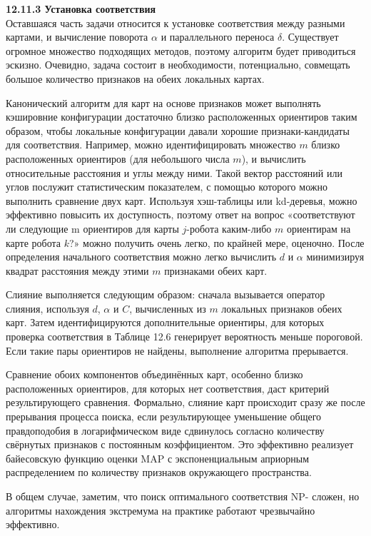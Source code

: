\documentclass[10pt,a4paper]{article}
\begin{document}
\textbf{12.11.3	Установка соответствия}\\

Оставшаяся часть задачи относится к установке соответствия между разными картами, и вычисление поворота $\alpha$ и параллельного переноса $\delta$. Существует огромное множество подходящих методов, поэтому алгоритм будет приводиться эскизно. Очевидно, задача состоит в необходимости, потенциально, совмещать большое количество признаков на обеих локальных картах.

Канонический алгоритм для карт на основе признаков может выполнять кэшировние конфигурации достаточно близко расположенных ориентиров таким образом, чтобы локальные конфигурации давали хорошие признаки-кандидаты для соответствия. Например, можно идентифицировать множество $m$ близко расположенных ориентиров (для небольшого числа $m$), и вычислить относительные расстояния и углы между ними. Такой вектор расстояний или углов послужит статистическим показателем, с помощью которого можно выполнить сравнение двух карт. Используя хэш-таблицы или kd-деревья, можно эффективно повысить их доступность, поэтому ответ на вопрос «соответствуют ли следующие m ориентиров для карты $j$-робота каким-либо $m$ ориентирам на карте робота $k$?» можно получить очень легко, по крайней мере, оценочно. После определения начального соответствия можно легко вычислить $d$ и $\alpha$ минимизируя квадрат расстояния между этими $m$ признаками обеих карт.

Слияние выполняется следующим образом: сначала вызывается оператор слияния, используя $d$, $\alpha$ и $C$, вычисленных из $m$ локальных признаков обеих карт. Затем идентифицируются дополнительные ориентиры, для которых проверка соответствия в Таблице 12.6 генерирует вероятность меньше пороговой. Если такие пары ориентиров не найдены, выполнение алгоритма прерывается.

Сравнение обоих компонентов объединённых карт, особенно близко расположенных ориентиров, для которых нет соответствия, даст критерий результирующего сравнения. Формально, слияние карт происходит сразу же после прерывания процесса поиска, если результирующее уменьшение общего правдоподобия в логарифмическом виде сдвинулось согласно количеству свёрнутых признаков с постоянным коэффициентом. Это эффективно реализует байесовскую функцию оценки MAP с экспоненциальным априорным распределением по количеству признаков окружающего пространства.

В общем случае, заметим, что поиск оптимального соответствия NP- сложен, но алгоритмы нахождения экстремума на практике работают чрезвычайно эффективно.\\
\end{document}
